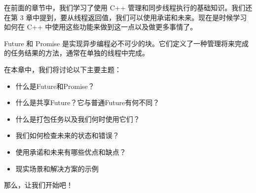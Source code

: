 在前面的章节中，我们学习了使用 C++ 管理和同步线程执行的基础知识。我们还在第 3 章中提到，要从线程返回值，我们可以使用承诺和未来。现在是时候学习如何在 C++ 中使用这些功能来做到这一点以及做更多事情了。

Future 和 Promise 是实现异步编程必不可少的块。它们定义了一种管理将来完成的任务结果的方法，通常在单独的线程中完成。

在本章中，我们将讨论以下主要主题：

\begin{itemize}
\item
什么是Future和Promise？

\item
什么是共享Future？它与普通Future有何不同？

\item
什么是打包任务以及我们何时使用它们？

\item
我们如何检查未来的状态和错误？

\item
使用承诺和未来有哪些优点和缺点？

\item
现实场景和解决方案的示例
\end{itemize}

那么，让我们开始吧！